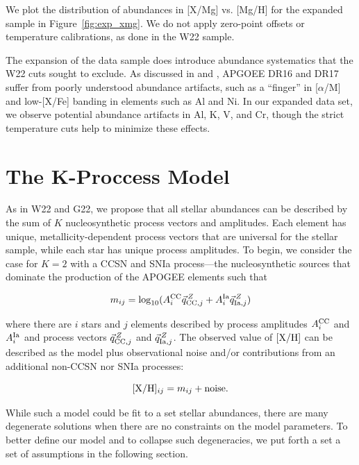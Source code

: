 \documentclass[modern]{aastex631}
\newcommand{\xh}{[{\rm X}/{\rm H}]}
\begin{document}
We plot the distribution of abundances in [X/Mg] vs. [Mg/H] for the expanded sample in Figure~\ref{fig:exp_xmg}. We do not apply zero-point offsets or temperature calibrations, as done in the W22 sample. 

The expansion of the data sample does introduce abundance systematics that the W22 cuts sought to exclude. As discussed in \citet{jonsson2020} and \citet{griffith2021a}, APGOEE DR16 and DR17 suffer from poorly understood abundance artifacts, such as a ``finger'' in [$\alpha$/M] and low-[X/Fe] banding in elements such as Al and Ni. In our expanded data set, we observe potential abundance artifacts in Al, K, V, and Cr, though the strict temperature cuts help to minimize these effects.  

\section{The K-Proccess Model}\label{sec:model}

As in W22 and G22, we propose that all stellar abundances can be described by the sum of $K$ nucleosynthetic process vectors and amplitudes. Each element has unique, metallicity-dependent process vectors that are universal for the stellar sample, while each star has unique process amplitudes. To begin, we consider the case for $K=2$ with a CCSN and SNIa process---the nucleosynthetic sources that dominate the production of the APOGEE elements \citep[e.g.,][]{andrews2017} such that

\begin{equation} \label{eq:m_ij}
    m_{ij} = \log_{10}(A_i^{\rm CC} \vec{q}_{{\rm CC}, j}^{\,Z} + A_i^{\rm Ia} \vec{q}_{{\rm Ia}, j}^{\,Z}) 
\end{equation}

where there are $i$ stars and $j$ elements described by process amplitudes $A_i^{\rm CC}$ and $A_i^{\rm Ia}$ and process vectors $\vec{q}_{{\rm CC}, j}^{\,Z}$ and $\vec{q}_{{\rm Ia}, j}^{\,Z}$. The observed value of $\xh$ can be described as the model plus observational noise and/or contributions from an additional non-CCSN nor SNIa processes:

\begin{equation} \label{eq:xh}
    \xh_{ij} = m_{ij} + \text{noise}.
\end{equation}

While such a model could be fit to a set stellar abundances, there are many degenerate solutions when there are no constraints on the model parameters. To better define our model and to collapse such degeneracies, we put forth a set a set of assumptions in the following section.
\end{document}
